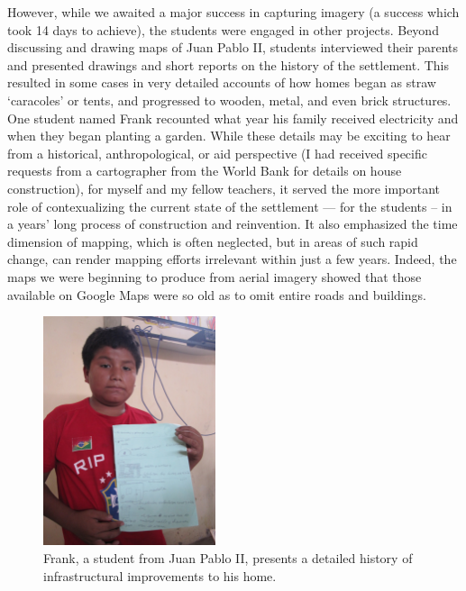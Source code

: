 \documentclass[11pt]{report}
\begin{document}
However, while we awaited a major success in capturing imagery (a success which took 14 days to achieve), the students were engaged in other projects. Beyond discussing and drawing maps of Juan Pablo II, students interviewed their parents and presented drawings and short reports on the history of the settlement. This resulted in some cases in very detailed accounts of how homes began as straw `caracoles' or tents, and progressed to wooden, metal, and even brick structures. One student named Frank recounted what year his family received electricity and when they began planting a garden. While these details may be exciting to hear from a historical, anthropological, or aid perspective (I had received specific requests from a cartographer from the World Bank for details on house construction), for myself and my fellow teachers, it served the more important role of contexualizing the current state of the settlement --- for the students -- in a years' long process of construction and reinvention. It also emphasized the time dimension of mapping, which is often neglected, but in areas of such rapid change, can render mapping efforts irrelevant within just a few years. Indeed, the maps we were beginning to produce from aerial imagery showed that those available on Google Maps were so old as to omit entire roads and buildings.

\begin{figure}
	\begin{flushright}
		\includegraphics[width=0.45\textwidth]{images/juan-pablo-frank.jpg}
		\caption{Frank, a student from Juan Pablo II, presents a detailed history of infrastructural improvements to his home.}
	\end{flushright}
\end{figure}
\end{document}
